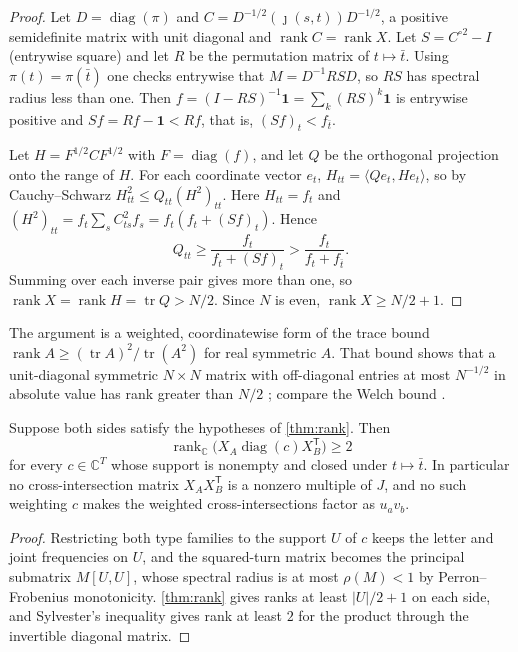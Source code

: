 \documentclass[11pt]{article}
\theoremstyle{definition}
\theoremstyle{plain}
\newcommand{\C}{\mathbb{C}}
\newcommand{\one}{\mathbf{1}}
\DeclareMathOperator{\rank}{rank}
\begin{document}
\begin{proof}
Let $D=\operatorname{diag}(\pi)$ and $C=D^{-1/2}(\jmath(s,t))D^{-1/2}$, a positive semidefinite matrix with unit diagonal and $\rank C=\rank X$. Let $S=C^{\circ2}-I$ (entrywise square) and let $R$ be the permutation matrix of $t\mapsto\bar t$. Using $\pi(t)=\pi(\bar t)$ one checks entrywise that $M=D^{-1}RSD$, so $RS$ has spectral radius less than one. Then $f=(I-RS)^{-1}\one=\sum_k(RS)^k\one$ is entrywise positive and $Sf=Rf-\one<Rf$, that is, $(Sf)_t<f_{\bar t}$.

Let $H=F^{1/2}CF^{1/2}$ with $F=\operatorname{diag}(f)$, and let $Q$ be the orthogonal projection onto the range of $H$. For each coordinate vector $e_t$, $H_{tt}=\langle Qe_t,He_t\rangle$, so by Cauchy--Schwarz $H_{tt}^2\le Q_{tt}(H^2)_{tt}$. Here $H_{tt}=f_t$ and $(H^2)_{tt}=f_t\sum_sC_{ts}^2f_s=f_t(f_t+(Sf)_t)$. Hence
\[
Q_{tt}\ge\frac{f_t}{f_t+(Sf)_t}>\frac{f_t}{f_t+f_{\bar t}}.
\]
Summing over each inverse pair gives more than one, so $\rank X=\rank H=\operatorname{tr}Q>N/2$. Since $N$ is even, $\rank X\ge N/2+1$.
\end{proof}

The argument is a weighted, coordinatewise form of the trace bound $\rank A\ge(\operatorname{tr}A)^2/\operatorname{tr}(A^2)$ for real symmetric $A$. That bound shows that a unit-diagonal symmetric $N\times N$ matrix with off-diagonal entries at most $N^{-1/2}$ in absolute value has rank greater than $N/2$ \cite[Lemma~2.2]{Alon2009}; compare the Welch bound \cite{Welch1974}.

\begin{corollary}\label{cor:nogo}
Suppose both sides satisfy the hypotheses of \cref{thm:rank}. Then\[\rank_\C\bigl(X_A\operatorname{diag}(c)X_B^{\mathsf T}\bigr)\ge2\] for every $c\in\C^T$ whose support is nonempty and closed under $t\mapsto\bar t$. In particular no cross-intersection matrix $X_AX_B^{\mathsf T}$ is a nonzero multiple of $J$, and no such weighting $c$ makes the weighted cross-intersections factor as $u_av_b$.
\end{corollary}

\begin{proof}
Restricting both type families to the support $U$ of $c$ keeps the letter and joint frequencies on $U$, and the squared-turn matrix becomes the principal submatrix $M[U,U]$, whose spectral radius is at most $\rho(M)<1$ by Perron--Frobenius monotonicity. \cref{thm:rank} gives ranks at least $|U|/2+1$ on each side, and Sylvester's inequality gives rank at least $2$ for the product through the invertible diagonal matrix.
\end{proof}
\end{document}
